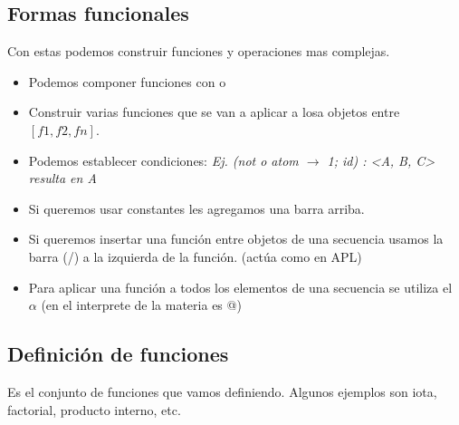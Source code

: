 \subsection*{Formas funcionales}
Con estas podemos construir funciones y operaciones mas complejas.

\begin{itemize}
\item Podemos componer funciones con o
\item Construir varias funciones que se van a aplicar a losa objetos entre $[ f1, f2, fn ]$.
\item Podemos establecer condiciones: \textit{Ej. (not o atom $\rightarrow$ 1; id) : <A, B, C> resulta en A }
\item Si queremos usar constantes les agregamos una barra arriba.
\item Si queremos insertar una función entre objetos de una secuencia usamos la barra (/) a la izquierda de la función. (actúa como en APL)
\item Para aplicar una función a todos los elementos de una secuencia se utiliza el $\alpha$ (en el interprete de la materia es @)
\end{itemize}


\subsection*{Definición de funciones}
Es el conjunto de funciones que vamos definiendo. Algunos ejemplos son iota, factorial, producto interno, etc.







